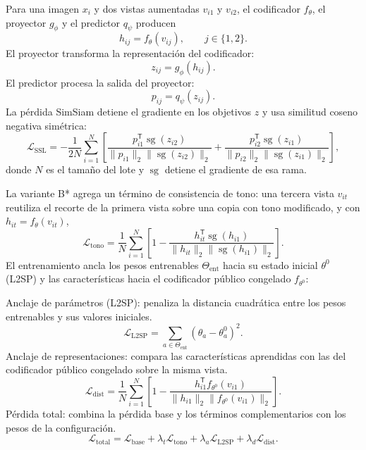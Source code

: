 Para una imagen $x_i$ y dos vistas aumentadas $v_{i1}$ y $v_{i2}$, el codificador $f_\theta$, el proyector $g_\phi$ y el predictor $q_\psi$ producen
\begin{equation}
 h_{ij}=f_\theta(v_{ij}),\qquad j\in\{1,2\}.
\end{equation}
El proyector transforma la representación del codificador:
\begin{equation}
 z_{ij}=g_\phi(h_{ij}).
\end{equation}
El predictor procesa la salida del proyector:
\begin{equation}
 p_{ij}=q_\psi(z_{ij}).
\end{equation}
La pérdida SimSiam detiene el gradiente en los objetivos $z$ y usa similitud coseno negativa simétrica:
\begin{equation}
 \mathcal L_{\mathrm{SSL}}=-\frac{1}{2N}\sum_{i=1}^{N}\left[
 \frac{p_{i1}^{\mathsf T}\operatorname{sg}(z_{i2})}{\|p_{i1}\|_2\|\operatorname{sg}(z_{i2})\|_2}
 +\frac{p_{i2}^{\mathsf T}\operatorname{sg}(z_{i1})}{\|p_{i2}\|_2\|\operatorname{sg}(z_{i1})\|_2}\right],
\end{equation}
donde $N$ es el tamaño del lote y $\operatorname{sg}$ detiene el gradiente de esa rama.

La variante B* agrega un término de consistencia de tono: una tercera vista $v_{it}$ reutiliza el recorte de la primera vista sobre una copia con tono modificado, y con $h_{it}=f_\theta(v_{it})$,
\begin{equation}
 \mathcal L_{\mathrm{tono}}=\frac{1}{N}\sum_{i=1}^{N}\left[
 1-\frac{h_{it}^{\mathsf T}\operatorname{sg}(h_{i1})}{\|h_{it}\|_2\|\operatorname{sg}(h_{i1})\|_2}\right].
\end{equation}
El entrenamiento ancla los pesos entrenables $\Theta_{\mathrm{ent}}$ hacia su estado inicial $\theta^0$ (L2SP) y las características hacia el codificador público congelado $f_{\theta^0}$:

\noindent Anclaje de parámetros (L2SP): penaliza la distancia cuadrática entre los pesos entrenables y sus valores iniciales.
\begin{equation}
 \mathcal L_{\mathrm{L2SP}}=\sum_{a\in\Theta_{\mathrm{ent}}}(\theta_a-\theta_a^0)^2.
\end{equation}
\noindent Anclaje de representaciones: compara las características aprendidas con las del codificador público congelado sobre la misma vista.
\begin{equation}
 \mathcal L_{\mathrm{dist}}=\frac{1}{N}\sum_{i=1}^{N}\left[
 1-\frac{h_{i1}^{\mathsf T}f_{\theta^0}(v_{i1})}{\|h_{i1}\|_2\|f_{\theta^0}(v_{i1})\|_2}\right].
\end{equation}
\noindent Pérdida total: combina la pérdida base y los términos complementarios con los pesos de la configuración.
\begin{equation}
 \mathcal L_{\mathrm{total}}=\mathcal L_{\mathrm{base}}+\lambda_t\mathcal L_{\mathrm{tono}}+
 \lambda_a\mathcal L_{\mathrm{L2SP}}+\lambda_d\mathcal L_{\mathrm{dist}}.
\end{equation}

